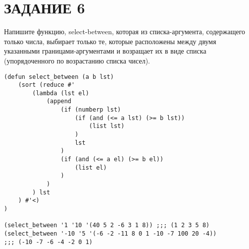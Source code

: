 \section{ЗАДАНИЕ 6}

Напишите функцию, select-between, которая из списка-аргумента, содержащего
только числа, выбирает только те, которые расположены между двумя указанными
границами-аргументами и возращает их в виде списка (упорядоченного по
возрастанию списка чисел).

\begin{lstlisting}
(defun select_between (a b lst)
    (sort (reduce #'
        (lambda (lst el)
            (append
                (if (numberp lst)
                    (if (and (<= a lst) (>= b lst))
                        (list lst)
                    )
                    lst
                )
                (if (and (<= a el) (>= b el))
                    (list el)
                )
            )
        ) lst
    ) #'<)
)

(select_between '1 '10 '(40 5 2 -6 3 1 8)) ;;; (1 2 3 5 8)
(select_between '-10 '5 '(-6 -2 -11 8 0 1 -10 -7 100 20 -4))
;;; (-10 -7 -6 -4 -2 0 1)
\end{lstlisting}
